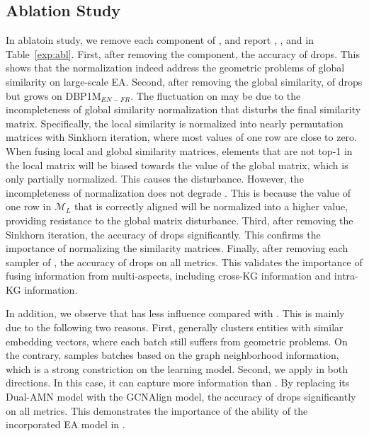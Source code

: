 \subsection{Ablation Study}\label{sec:ablation}
In ablatoin study, we remove
each component of \ClusterEA{}, and report \HitOne{}, \HitTen{}, and \MRR{} in Table~\ref{exp:abl}.
First, after removing the \SparseCSLS{} component, the accuracy of \ClusterEA{} drops. This shows that the \SparseCSLS{} normalization indeed address the geometric problems of global similarity on large-scale EA.
Second, after removing the global similarity, \HitOne{} of \ClusterEA{} drops but \HitTen{} grows on DBP1M$_{EN-FR}$. The fluctuation on \HitTen{} may be due to the incompleteness of global similarity normalization
that disturbs the final similarity matrix.
Specifically,
the local similarity is normalized into nearly permutation matrices with Sinkhorn iteration, where most values of one row are close to zero.
When fusing local and global similarity matrices, elements that are not top-1 in the local matrix will be biased towards the value of the global matrix, which is only partially normalized.
This causes the disturbance.
However,
the incompleteness of normalization does not degrade \HitOne{}. This is because the value of one row in $\mathcal{M}_{L}$ that is correctly aligned will be normalized into a higher value, providing resistance to the global matrix disturbance.
Third, after removing the Sinkhorn iteration,  the accuracy of \ClusterEA{} drops significantly. This confirms the importance of normalizing the similarity matrices. Finally, after removing each sampler of \Sampling{}, the accuracy of \ClusterEA{} drops on all metrics. This validates the importance of fusing information from multi-aspects, including cross-KG information and intra-KG information.

In addition, we observe that \KMeans{} has less influence compared with \MetisGCN{}. This is mainly due to the following two reasons. First, \KMeans{} generally clusters entities with similar embedding vectors, where each batch still suffers from geometric problems. On the contrary,  \MetisGCN{} samples batches based on the graph neighborhood information, which is a strong constriction on the learning model. Second, we apply \MetisGCN{} in both directions. In this case, it can capture more information than \KMeans{}.
By replacing its Dual-AMN model with the GCNAlign model, the accuracy of \ClusterEA{} drops significantly on all metrics. This demonstrates the importance of the ability of the incorporated EA model in \ClusterEA{}.

